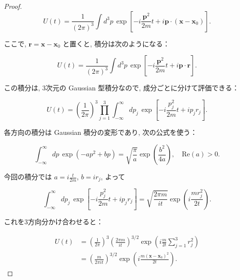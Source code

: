 \documentclass[a4paper,12pt]{article}
\begin{document}
\begin{proof}
\begin{equation*}
U(t) = \frac{1}{(2\pi)^3} \int d^3p \, \exp\left[ -i \frac{\boldsymbol{p}^2}{2m} t + i \boldsymbol{p} \cdot (\boldsymbol{x} - \boldsymbol{x}_0) \right]. \tag{2-1.a7}
\end{equation*}

ここで, \(\boldsymbol{r} = \boldsymbol{x} - \boldsymbol{x}_0\) と置くと, 積分は次のようになる：

\begin{equation*}
U(t) = \frac{1}{(2\pi)^3} \int d^3p \, \exp\left[ -i \frac{\boldsymbol{p}^2}{2m} t + i \boldsymbol{p} \cdot \boldsymbol{r} \right]. \tag{2-1.a8}
\end{equation*}

この積分は, 3次元の Gaussian 型積分なので, 成分ごとに分けて評価できる：

\begin{equation*}
U(t) = \left( \frac{1}{2\pi} \right)^3 \prod_{j = 1}^3 \int_{-\infty}^{\infty} dp_j \, \exp\left[ -i \frac{p_j^2}{2m} t + i p_j r_j \right]. \tag{2-1.a9}
\end{equation*}

各方向の積分は Gaussian 積分の変形であり, 次の公式を使う：

\begin{equation*}
\int_{-\infty}^\infty dp \, \exp\left( -a p^2 + b p \right) = \sqrt{ \frac{\pi}{a} } \exp\left( \frac{b^2}{4a} \right),
\quad \text{Re}(a) > 0. \tag{2-1.a10}
\end{equation*}

今回の積分では \( a = i \frac{t}{2m} \), \( b = i r_j \), よって

\begin{equation*}
\int_{-\infty}^{\infty} dp_j \, \exp\left[ -i \frac{p_j^2}{2m} t + i p_j r_j \right]
= \sqrt{ \frac{2\pi m}{i t} } \exp\left( i \frac{m r_j^2}{2t} \right). \tag{2-1.a11}
\end{equation*}

これを3方向分かけ合わせると：

\begin{align*}
U(t) &= \left( \frac{1}{2\pi} \right)^3 \left( \frac{2\pi m}{i t} \right)^{3/2}
\exp\left( i \frac{m}{2t} \sum_{j=1}^3 r_j^2 \right) \\
&= \left( \frac{m}{2\pi i t} \right)^{3/2} \exp\left( i \frac{m (\boldsymbol{x} - \boldsymbol{x}_0)^2}{2t} \right). \tag{2-1.a12}
\end{align*}
\end{proof}
\end{document}

